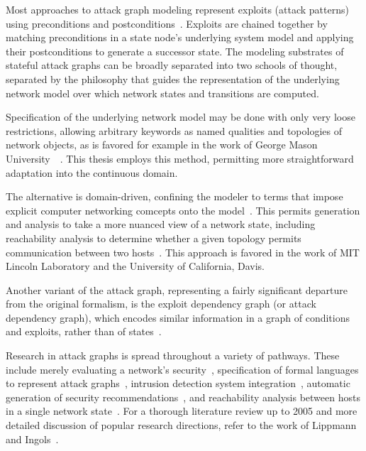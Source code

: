 Most approaches to attack graph modeling represent exploits (attack patterns) using
preconditions and postconditions~\cite{lippmann2005annotated, 
templeton2001requires}. Exploits are chained together by matching preconditions
in a state node's underlying system model and applying their postconditions to 
generate a successor state.
The modeling substrates of stateful attack graphs can be broadly separated into 
two schools of thought, separated by the philosophy that guides the representation of the underlying
network model over which network states and transitions are computed.

Specification of the underlying network model may be done with only very loose
restrictions, allowing arbitrary keywords as named qualities and topologies of 
network objects, as is favored for example in the work of George Mason 
University~\cite{ammann2002scalable}~\cite{wang2006minimum}.
This thesis employs this method, permitting more straightforward adaptation 
into the continuous domain.

The alternative is domain-driven, confining the modeler to
terms that impose explicit computer networking 
comcepts onto the model~\cite{templeton2001requires}.
This permits generation and analysis to take a
more nuanced view of a network state, including reachability analysis to determine whether a
given topology permits communication between two hosts~\cite{ingols2009modeling}. This approach
is favored in the work of MIT Lincoln Laboratory and the University of California, Davis.

Another variant of the attack graph, representing a fairly significant departure
from the original formalism, is the exploit dependency graph (or attack
dependency graph), which encodes similar information in a graph of conditions
and exploits, rather than of states~\cite{jajodia2005topological, 
noel2004managing, louthan2011toward}.

Research in attack graphs is spread throughout a variety of pathways. These include
merely evaluating a network's security~\cite{ammann2002scalable}, specification of formal languages
to represent attack graphs~\cite{templeton2001requires}, intrusion detection system 
integration~\cite{tidwell2001modeling}, automatic generation of security recommendations~\cite{wang2006minimum},
and reachability analysis between hosts in a single network state~\cite{ingols2009modeling}. 
For a thorough literature review up to 2005 and more detailed discussion of popular research directions, 
refer to the work of Lippmann and Ingols~\cite{lippmann2005annotated}.

